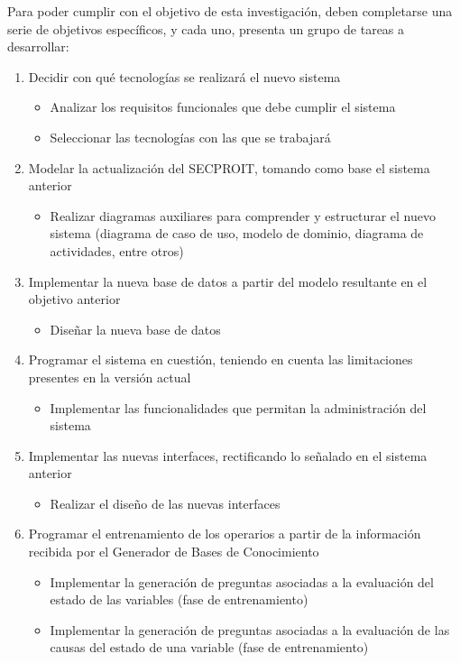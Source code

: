 \begin{itemize}
Para poder cumplir con el objetivo de esta investigación, deben completarse una serie de objetivos específicos, y cada uno, presenta un grupo de tareas a desarrollar:
\begin{enumerate}
\item Decidir con qué tecnologías se realizará el nuevo sistema
\begin{itemize}
\item Analizar los requisitos funcionales que debe cumplir el sistema
\item Seleccionar las tecnologías con las que se trabajará
\end{itemize}
\item Modelar la actualización del SECPROIT, tomando como base el sistema anterior
\begin{itemize}
\item Realizar diagramas auxiliares para comprender y estructurar el nuevo sistema (diagrama de caso de uso, modelo de dominio, diagrama de actividades, entre otros)
\end{itemize}
\item Implementar la nueva base de datos a partir del modelo resultante en el objetivo anterior
\begin{itemize}
\item Diseñar la nueva base de datos
\end{itemize}
\item Programar el sistema en cuestión, teniendo en cuenta las limitaciones presentes en la versión actual
\begin{itemize}
\item Implementar las funcionalidades que permitan la administración del sistema
\end{itemize}
\item Implementar las nuevas interfaces, rectificando lo señalado en el sistema anterior
\begin{itemize}
\item Realizar el diseño de las nuevas interfaces
\end{itemize}
\item Programar el entrenamiento de los operarios a partir de la información recibida por el Generador de Bases de Conocimiento
\begin{itemize}
\item Implementar la generación de preguntas asociadas a la evaluación del estado de las variables (fase de entrenamiento)
\item Implementar la generación de preguntas asociadas a la evaluación de las causas del estado de una variable (fase de entrenamiento)

\end{itemize}
\end{enumerate}
\end{itemize}
